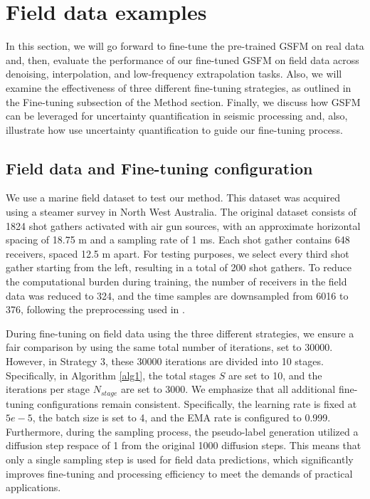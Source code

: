 \section{\textbf{Field data examples}}
In this section, we will go forward to fine-tune the pre-trained GSFM on real data and, then, evaluate the performance of our fine-tuned GSFM on field data across denoising, interpolation, and low-frequency extrapolation tasks. Also, we will examine the effectiveness of three different fine-tuning strategies, as outlined in the Fine-tuning subsection of the Method section. Finally, we discuss how GSFM can be leveraged for uncertainty quantification in seismic processing and, also, illustrate how use uncertainty quantification to guide our fine-tuning process.

\subsection{Field data and Fine-tuning configuration}
We use a marine field dataset to test our method. This dataset was acquired using a steamer survey in North West Australia. The original dataset consists of 1824 shot gathers activated with air gun sources, with an approximate horizontal spacing of 18.75 m and a sampling rate of 1 ms. Each shot gather contains 648 receivers, spaced 12.5 m apart. For testing purposes, we select every third shot gather starting from the left, resulting in a total of 200 shot gathers. To reduce the computational burden during training, the number of receivers in the field data was reduced to 324, and the time samples are downsampled from 6016 to 376, following the preprocessing used in \cite{harsuko2024optimizing}. 

During fine-tuning on field data using the three different strategies, we ensure a fair comparison by using the same total number of iterations, set to 30000. However, in Strategy 3, these 30000 iterations are divided into 10 stages. Specifically, in Algorithm \ref{alg1}, the total stages $S$ are set to 10, and the iterations per stage $N_{stage}$ are set to 3000. We emphasize that all additional fine-tuning configurations remain consistent. Specifically, the learning rate is fixed at $5e-5$, the batch size is set to 4, and the EMA rate is configured to 0.999. Furthermore, during the sampling process, the pseudo-label generation utilized a diffusion step respace of 1 from the original 1000 diffusion steps. This means that only a single sampling step is used for field data predictions, which significantly improves fine-tuning and processing efficiency to meet the demands of practical applications. 

